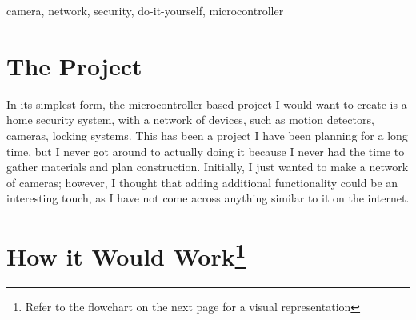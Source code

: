 \documentclass[conference]{IEEEtran}
\begin{document}
\begin{IEEEkeywords}
  camera, network, security, do-it-yourself, microcontroller
\end{IEEEkeywords}

\section{The Project}

In its simplest form, the microcontroller-based project I would want to create is a home security system, with a network of devices, such as motion detectors, cameras, locking systems. This has been a project I have been planning for a long time, but I never got around to actually doing it because I never had the time to gather materials and plan construction. Initially, I just wanted to make a network of cameras; however, I thought that adding additional functionality could be an interesting touch, as I have not come across anything similar to it on the internet.

\section{How it Would Work\footnote{Refer to the flowchart on the next page for a visual representation}}
\end{document}
